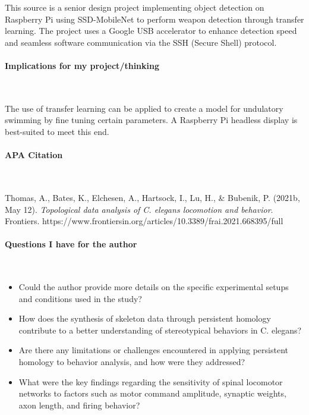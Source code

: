 This source is a senior design project implementing object detection on Raspberry Pi using SSD-MobileNet to perform weapon detection through transfer learning. The project uses a Google USB accelerator to enhance detection speed and seamless software communication via the SSH (Secure Shell) protocol.

\vspace*{-0.5cm}
\paragraph{Implications for my project/thinking} \

The use of transfer learning can be applied to create a model for undulatory swimming by fine tuning certain parameters. A Raspberry Pi headless display is best-suited to meet this end.

\newpage

\vspace*{-0.5cm}
\paragraph{APA Citation} \

\begin{hangparas}{.25in}{1}
Thomas, A., Bates, K., Elchesen, A., Hartsock, I., Lu, H., \& Bubenik, P. (2021b, May 12). \textit{Topological data analysis of C. elegans locomotion and behavior}. Frontiers. https://www.frontiersin.org/articles/10.3389/frai.2021.668395/full
\end{hangparas}

\vspace*{-0.5cm}
\paragraph{Questions I have for the author} \ 

\begin{itemize}
    \item Could the author provide more details on the specific experimental setups and conditions used in the study?
    \item How does the synthesis of skeleton data through persistent homology contribute to a better understanding of stereotypical behaviors in C. elegans?
    \item Are there any limitations or challenges encountered in applying persistent homology to behavior analysis, and how were they addressed?
    \item What were the key findings regarding the sensitivity of spinal locomotor networks to factors such as motor command amplitude, synaptic weights, axon length, and firing behavior?
\end{itemize}

